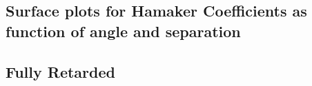 \documentclass[a4paper]{article}
\begin{document}
\begin{center}
%
%

\chapter{Surface plots for Hamaker Coefficients as function of angle and
separation}

\section{Fully Retarded}


\end{center}
\end{document}
